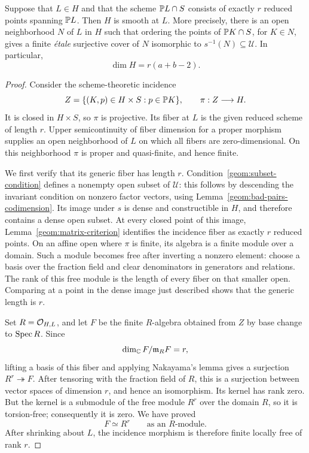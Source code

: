 \begin{lemma}\label{geom:smooth-span}
Suppose that $L\in H$ and that the scheme $\mathbb P L\cap S$ consists
of exactly $r$ reduced points spanning $\mathbb P L$. Then $H$ is smooth
at $L$. More precisely, there is an open neighborhood $N$ of $L$ in
$H$ such that ordering the points of $\mathbb P K\cap S$, for $K\in N$,
gives a finite \emph{\'etale} surjective cover of $N$ isomorphic to
$s^{-1}(N)\subseteq\mathcal U$. In particular,
\begin{equation}\label{geom:dimension-H}
 \dim H=r(a+b-2).
\end{equation}
\end{lemma}

\begin{proof}
Consider the scheme-theoretic incidence
\[
 Z=\{(K,p)\in H\times S:p\in\mathbb P K\},\qquad
 \pi:Z\longrightarrow H.
\]
It is closed in $H\times S$, so $\pi$ is projective. Its fiber at
$L$ is the given reduced scheme of length $r$. Upper semicontinuity
of fiber dimension for a proper morphism supplies an open
neighborhood of $L$ on which all fibers are zero-dimensional.
On this neighborhood $\pi$ is proper and quasi-finite, and hence
finite.

We first verify that its generic fiber has length $r$.
Condition~\eqref{geom:subset-condition} defines a nonempty open
subset of $\mathcal U$: this follows by descending the invariant
condition on nonzero factor vectors, using
Lemma~\ref{geom:bad-pairs-codimension}. Its image under $s$ is dense
and constructible in $H$, and therefore contains a dense open subset.
At every closed point of this image,
Lemma~\ref{geom:matrix-criterion} identifies the incidence fiber as
exactly $r$ reduced points. On an affine open where $\pi$ is finite,
its algebra is a finite module over a domain. Such a module becomes
free after inverting a nonzero element: choose a basis over the
fraction field and clear denominators in generators and relations.
The rank of this free module is the length of every fiber on that
smaller open. Comparing at a point in the dense image just described
shows that the generic length is $r$.

Set $R=\mathcal O_{H,L}$, and let $F$ be the finite $R$-algebra obtained
from $Z$ by base change to $\operatorname{Spec} R$. Since
\[
 \dim_{\mathbb C}F/\mathfrak m_R F=r,
\]
lifting a basis of this fiber and applying Nakayama's lemma gives
a surjection $R^r\twoheadrightarrow F$. After tensoring with the
fraction field of $R$, this is a surjection between vector spaces
of dimension $r$, and hence an isomorphism. Its kernel has rank
zero. But the kernel is a submodule of the free module $R^r$ over
the domain $R$, so it is torsion-free; consequently it is zero.
We have proved
\begin{equation}\label{geom:finite-free-incidence}
 F\simeq R^r\qquad\text{as an }R\text{-module}.
\end{equation}
After shrinking about $L$, the incidence morphism is therefore
finite locally free of rank $r$.


\end{proof}
